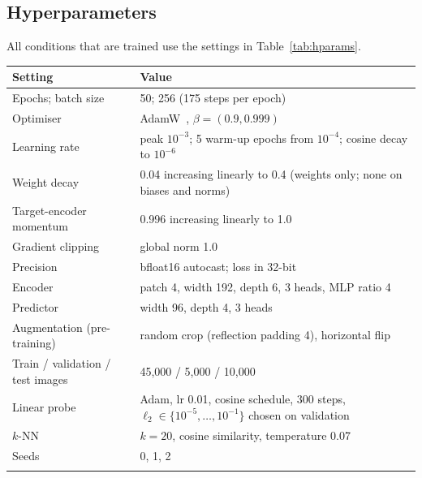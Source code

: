 \documentclass[pdflatex,sn-basic]{sn-jnl}%
\begin{document}
\begin{appendices}

\section{Hyperparameters}\label{app:hparams}
All conditions that are trained use the settings in Table~\ref{tab:hparams}.

\begin{center}
\label{tab:hparams}
\begin{tabular}{@{}lp{}@{}}
\toprule
Setting & Value\\
\midrule
Epochs; batch size & 50; 256 (175 steps per epoch)\\
Optimiser & AdamW~\cite{loshchilov2019adamw}, $\beta=(0.9,0.999)$\\
Learning rate & peak $10^{-3}$; 5 warm-up epochs from $10^{-4}$; cosine decay to $10^{-6}$\\
Weight decay & 0.04 increasing linearly to 0.4 (weights only; none on biases and norms)\\
Target-encoder momentum & 0.996 increasing linearly to 1.0\\
Gradient clipping & global norm 1.0\\
Precision & bfloat16 autocast; loss in 32-bit\\
Encoder & patch 4, width 192, depth 6, 3 heads, MLP ratio 4\\
Predictor & width 96, depth 4, 3 heads\\
Augmentation (pre-training) & random crop (reflection padding 4), horizontal flip\\
Train / validation / test images & 45,000 / 5,000 / 10,000\\
Linear probe & Adam, lr 0.01, cosine schedule, 300 steps, $\ell_2\in\{10^{-5},\dots,10^{-1}\}$ chosen on validation\\
$k$-NN & $k=20$, cosine similarity, temperature 0.07\\
Seeds & 0, 1, 2\\
\botrule
\end{tabular}
\end{center}


\end{appendices}
\end{document}
